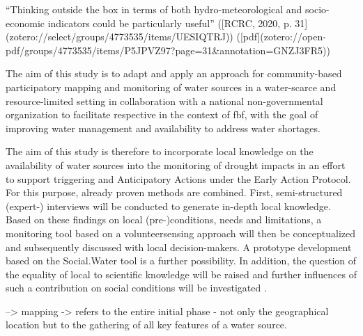 “Thinking outside the box in terms of both hydro-meteorological and socio-economic indicators could be particularly useful” ([RCRC, 2020, p. 31](zotero://select/groups/4773535/items/UESIQTRJ)) ([pdf](zotero://open-pdf/groups/4773535/items/P5JPVZ97?page=31&annotation=GNZJ3FR5))

The aim of this study is to adapt and apply an approach for community-based participatory mapping and monitoring of water sources in a water-scarce and resource-limited setting in collaboration with a national non-governmental organization to facilitate respective  in the context of \acrlong{fbf}, with the goal of improving water management and availability to address water shortages.

The aim of this study is therefore to incorporate local knowledge on the availability of water sources into the monitoring of drought impacts in an effort to support triggering and Anticipatory Actions under the Early Action Protocol. For this purpose, already proven methods are combined. First, semi-structured (expert-) interviews will be conducted to generate in-depth local knowledge. Based on these findings on local (pre-)conditions, needs and limitations, a monitoring tool based on a volunteersensing approach will then be conceptualized and subsequently discussed with local decision-makers. A prototype development based on the Social.Water tool is a further possibility. In addition, the question of the equality of local to scientific knowledge will be raised and further influences of such a contribution on social conditions will be investigated .


--> mapping -> refers to the entire initial phase - not only the geographical location but to the gathering of all key features of a water source. 



